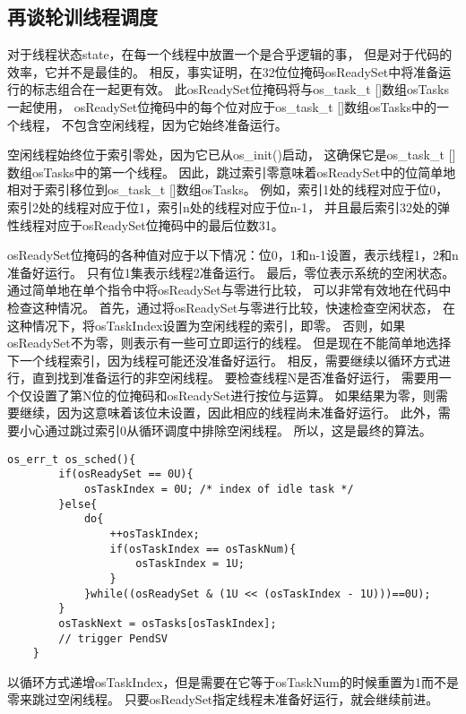 \subsection{再谈轮训线程调度}

对于线程状态state，在每一个线程中放置一个是合乎逻辑的事，
但是对于代码的效率，它并不是最佳的。
相反，事实证明，在32位位掩码osReadySet中将准备运行的标志组合在一起更有效。
此osReadySet位掩码将与os\_task\_t []数组osTasks一起使用，
osReadySet位掩码中的每个位对应于os\_task\_t []数组osTasks中的一个线程，
不包含空闲线程，因为它始终准备运行。

空闲线程始终位于索引零处，因为它已从os\_init()启动，
这确保它是os\_task\_t []数组osTasks中的第一个线程。
因此，跳过索引零意味着osReadySet中的位简单地相对于索引移位到os\_task\_t []数组osTasks。
例如，索引1处的线程对应于位0，索引2处的线程对应于位1，索引n处的线程对应于位n-1，
并且最后索引32处的弹性线程对应于osReadySet位掩码中的最后位数31。

osReadySet位掩码的各种值对应于以下情况：位0，1和n-1设置，表示线程1，2和n准备好运行。
只有位1集表示线程2准备运行。
最后，零位表示系统的空闲状态。通过简单地在单个指令中将osReadySet与零进行比较，
可以非常有效地在代码中检查这种情况。 
首先，通过将osReadySet与零进行比较，快速检查空闲状态，
在这种情况下，将osTaskIndex设置为空闲线程的索引，即零。
否则，如果osReadySet不为零，则表示有一些可立即运行的线程。
但是现在不能简单地选择下一个线程索引，因为线程可能还没准备好运行。
相反，需要继续以循环方式进行，直到找到准备运行的非空闲线程。
要检查线程N是否准备好运行，
需要用一个仅设置了第N位的位掩码和osReadySet进行按位与运算。
如果结果为零，则需要继续，因为这意味着该位未设置，因此相应的线程尚未准备好运行。
此外，需要小心通过跳过索引0从循环调度中排除空闲线程。
所以，这是最终的算法。
\begin{lstlisting}[language={[ANSI]C},keywordstyle=\color{blue!70},commentstyle=\color{red!50!green!50!blue!50},frame=shadowbox, rulesepcolor=\color{red!20!green!20!blue!20}]
    os_err_t os_sched(){
        if(osReadySet == 0U){
            osTaskIndex = 0U; /* index of idle task */
        }else{
            do{
                ++osTaskIndex;
                if(osTaskIndex == osTaskNum){
                    osTaskIndex = 1U;
                }
            }while((osReadySet & (1U << (osTaskIndex - 1U)))==0U);
        }
        osTaskNext = osTasks[osTaskIndex];
        // trigger PendSV
    }
\end{lstlisting}
以循环方式递增osTaskIndex，但是需要在它等于osTaskNum的时候重置为1而不是零来跳过空闲线程。
只要osReadySet指定线程未准备好运行，就会继续前进。

